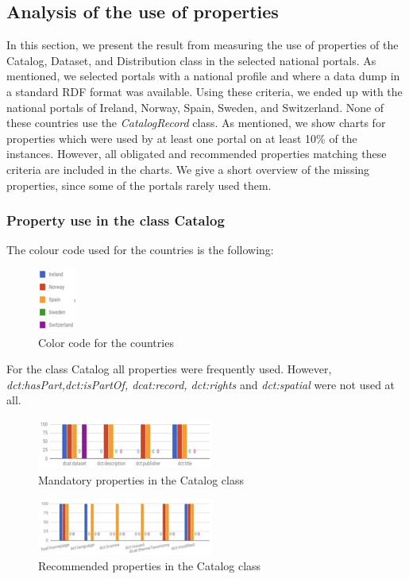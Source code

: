 \documentclass[<options>]{elsarticle}
\begin{document}
\subsection{Analysis of the use of properties}
In this section, we present the result from measuring the use of properties of the Catalog, Dataset, and Distribution class in the selected national portals. As mentioned, we selected portals with a national profile and where a data dump in a standard RDF format was available. Using these criteria, we ended up with the national portals of Ireland, Norway, Spain, Sweden, and Switzerland. None of these countries use the \textit{CatalogRecord} class. As mentioned, we show charts for properties which were used by at least one portal on at least 10\% of the instances. However, all obligated and recommended properties matching these criteria are included in the charts. We give a short overview of the missing properties, since some of the portals rarely used them.

\subsubsection{Property use in the class Catalog}
The colour code used for the countries is the following:
\begin{figure}[!h]
\includegraphics{replace3.png}
\caption{Color code for the countries}
\end{figure}

For the class Catalog all properties were frequently used. However, \textit{dct:hasPart,dct:isPartOf, dcat:record, dct:rights }and\textit{ dct:spatial }were not used at all.
\begin{figure}[!h]
\includegraphics{replace4.png}
\caption{Mandatory properties in the Catalog class}
\end{figure}

\begin{figure}[!h]
\includegraphics{replace5.png}
\caption{Recommended properties in the Catalog class}
\end{figure}
\end{document}
